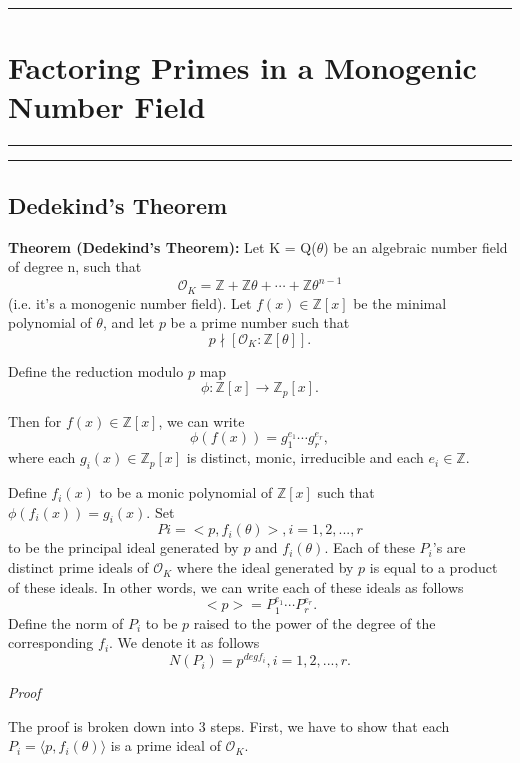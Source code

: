 \medskip 
{\color{gray}\hrule}
\section{Factoring Primes in a Monogenic Number Field}
\medskip 
{\color{gray}\hrule}
\medskip 

{\color{gray}\hrule}
\subsection{Dedekind's Theorem}

\begin{flushleft}
    \quad\textbf{Theorem (Dedekind's Theorem):} Let K = Q($\theta$) be an algebraic number field of degree n, such that 
    \[
    \mathcal{O}_K = \mathbb{Z} + \mathbb{Z}\theta + \cdots + \mathbb{Z}\theta^{n-1}
    \]
     (i.e. it's a monogenic number field). 
    Let $f(x) \in \mathbb{Z}[x]$ be the minimal polynomial of $\theta$, and let $p$ be a prime number such that
    \[
    p \nmid [\mathcal{O}_K : \mathbb{Z}[\theta]].
    \]

    \medskip
    
     Define the reduction modulo $p$ map
     \[
     \phi : \mathbb{Z}[x] \to \mathbb{Z}_p[x] .
     \]
     
     \medskip
     Then for $f(x) \in \mathbb{Z}[x]$, we can write
     \[
     \phi(f(x)) = g_1^{e_1} \cdots g_r^{e_r},
     \]
     where each $g_i(x) \in \mathbb{Z}_p[x]$ is distinct, monic, irreducible and each $e_i \in \mathbb{Z}$.
     
    Define $f_i(x)$ to be a monic polynomial of $\mathbb{Z}[x]$ such that $\phi(f_i(x)) = g_i(x)$.
    Set 
    \[
    Pi = <p, f_i(\theta)>, i = 1,2,...,r 
    \]
    to be the principal ideal generated by $p$ and $f_i(\theta)$. Each of these $P_i$'s are distinct
    prime ideals of $\mathcal{O}_K$ where the ideal generated by $p$ is equal to a product of these ideals. 
    In other words, we can write each of these ideals as follows
    \[
    <p>=P_1^{e_1} \cdots P_r^{e_r}.
    \]
    Define the norm of $P_i$ to be $p$ raised to the power of the degree of the corresponding $f_i$. We denote it as follows
    \[
    N(P_i)=p^{deg f_i}, i = 1,2,...,r.
    \]
    
    \textit{Proof}
     
    \medskip 

    The proof is broken down into 3 steps. First, we have to show that each $P_i = \langle p, f_i(\theta)\rangle$ is a prime ideal of $\mathcal{O}_K$.
     

\end{flushleft}
